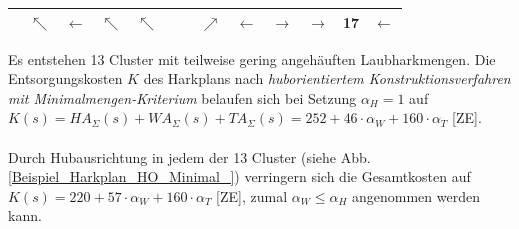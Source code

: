 \begin{center}
\begin{minipage}{\textwidth}
\begin{table}[H]
\begin{scriptsize}
\begin{tabular}{|>{}c|>{}c|>{}c|>{}c|>{}c|>{}c|>{}c|>{}c|>{}c|>{}c|>{}c|>{}c|>{}c|}
\hline
\cellcolor{gray!50!white} &$\nwarrow$&$\leftarrow$&\cellcolor{blue!15!white}$\nwarrow$&
\cellcolor{yellow!15!white}$\nwarrow$&\cellcolor{gray!50!white} &\cellcolor{gray!50!white} &\cellcolor{red!15!white}$\nearrow$&\cellcolor{red!15!white}$\leftarrow$& \cellcolor{green!15!white}$\rightarrow$&\cellcolor{green!15!white}$\rightarrow$&\cellcolor{green!15!white}\bf{17}&\cellcolor{green!15!white}$\leftarrow$ \\
\hline
\end{tabular}
\label{Beispiel_Harkplan_HO_Minimal}
\end{scriptsize} 
\end{table}
\renewcommand{\arraystretch}{1}
\end{minipage}
\end{center}

\noindent \newline Es entstehen 13 Cluster mit teilweise gering angehäuften Laubharkmengen. Die Entsorgungskosten $K$ des Harkplans nach \textit{huborientiertem Konstruktionsverfahren mit Minimalmengen-Kriterium} belaufen sich bei Setzung $\alpha_H=1$ auf $K(s) = HA_{\Sigma}(s) + WA_{\Sigma}(s) +TA_{\Sigma}(s) = 252 + 46 \cdot \alpha_W + 160 \cdot \alpha_T$ [ZE]. \\
\\
Durch Hubausrichtung in jedem der 13 Cluster (siehe Abb. \ref{Beispiel_Harkplan_HO_Minimal_}) verringern sich die Gesamtkosten auf $K(s) = 220 + 57 \cdot \alpha_W + 160 \cdot \alpha_T$ [ZE], zumal $\alpha_W\leq \alpha_H$ angenommen werden kann.

